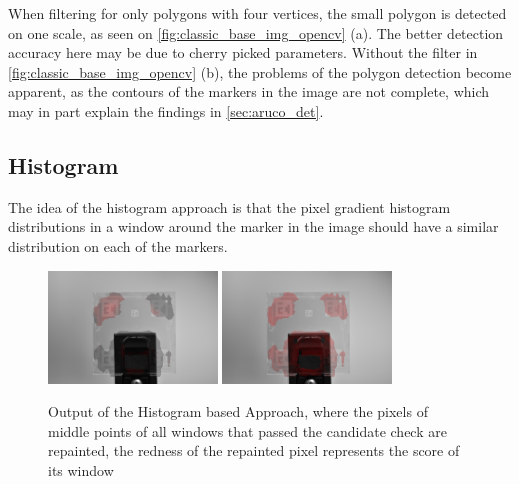 \documentclass[10pt]{book}
\begin{document}
When filtering for only polygons with four vertices, the small polygon is detected on one scale, as seen on \autoref{fig:classic_base_img_opencv} (a). The better detection accuracy here may be due to cherry picked parameters. Without the filter in \autoref{fig:classic_base_img_opencv} (b), the problems of the polygon detection become apparent, as the contours of the markers in the image are not complete, which may in part explain the findings in \autoref{sec:aruco_det}.

\subsection{Histogram}

The idea of the histogram approach is that the pixel gradient histogram distributions in a window around the marker in the image should have a similar distribution on each of the markers.

\begin{figure}
  \centering
     {\includegraphics[width=0.4\textwidth]{image/classic_hist_markerynesses}}
     {\includegraphics[width=0.4\textwidth]{image/classic_markeryness}}
  \caption{Output of the Histogram based Approach, where the pixels of middle points of all windows that passed the candidate check are repainted, the redness of the repainted pixel represents the score of its window}
  \label{fig:markeryness_scores}
\end{figure}
\end{document}
